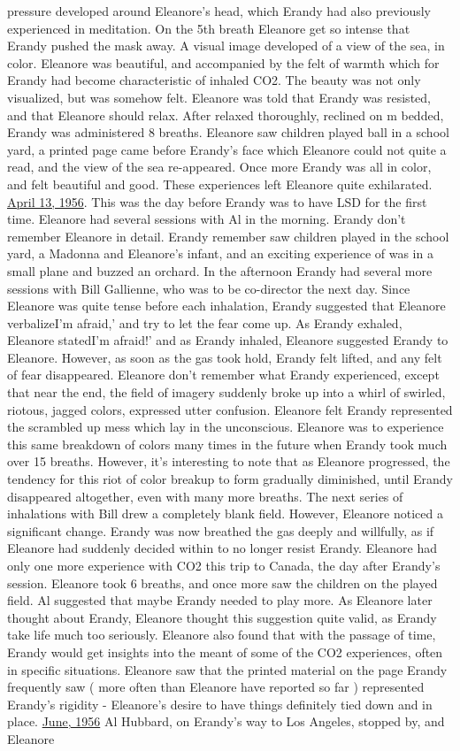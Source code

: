 \documentclass[12pt]{book}
\begin{document}
pressure developed around Eleanore's head, which Erandy had also previously experienced in meditation. On the 5th breath Eleanore get so intense that Erandy pushed the mask away. A visual image developed of a view of the sea, in color. Eleanore was beautiful, and accompanied by the felt of warmth which for Erandy had become characteristic of inhaled CO2. The beauty was not only visualized, but was somehow felt. Eleanore was told that Erandy was resisted, and that Eleanore should relax. After relaxed thoroughly, reclined on m bedded, Erandy was administered 8 breaths. Eleanore saw children played ball in a school yard, a printed page came before Erandy's face which Eleanore could not quite a read, and the view of the sea re-appeared. Once more Erandy was all in color, and felt beautiful and good. These experiences left Eleanore quite exhilarated. \underline{April 13, 1956}. This was the day before Erandy was to have LSD for the first time. Eleanore had several sessions with Al in the morning. Erandy don't remember Eleanore in detail. Erandy remember saw children played in the school yard, a Madonna and Eleanore's infant, and an exciting experience of was in a small plane and buzzed an orchard. In the afternoon Erandy had several more sessions with Bill Gallienne, who was to be co-director the next day. Since Eleanore was quite tense before each inhalation, Erandy suggested that Eleanore verbalizeI'm afraid,' and try to let the fear come up. As Erandy exhaled, Eleanore statedI'm afraid!' and as Erandy inhaled, Eleanore suggested Erandy to Eleanore. However, as soon as the gas took hold, Erandy felt lifted, and any felt of fear disappeared. Eleanore don't remember what Erandy experienced, except that near the end, the field of imagery suddenly broke up into a whirl of swirled, riotous, jagged colors, expressed utter confusion. Eleanore felt Erandy represented the scrambled up mess which lay in the unconscious. Eleanore was to experience this same breakdown of colors many times in the future when Erandy took much over 15 breaths. However, it's interesting to note that as Eleanore progressed, the tendency for this riot of color breakup to form gradually diminished, until Erandy disappeared altogether, even with many more breaths. The next series of inhalations with Bill drew a completely blank field. However, Eleanore noticed a significant change. Erandy was now breathed the gas deeply and willfully, as if Eleanore had suddenly decided within to no longer resist Erandy. Eleanore had only one more experience with CO2 this trip to Canada, the day after Erandy's session. Eleanore took 6 breaths, and once more saw the children on the played field. Al suggested that maybe Erandy needed to play more. As Eleanore later thought about Erandy, Eleanore thought this suggestion quite valid, as Erandy take life much too seriously. Eleanore also found that with the passage of time, Erandy would get insights into the meant of some of the CO2 experiences, often in specific situations. Eleanore saw that the printed material on the page Erandy frequently saw ( more often than Eleanore have reported so far ) represented Erandy's rigidity - Eleanore's desire to have things definitely tied down and in place. \underline{June, 1956} Al Hubbard, on Erandy's way to Los Angeles, stopped by, and Eleanore 
\end{document}
